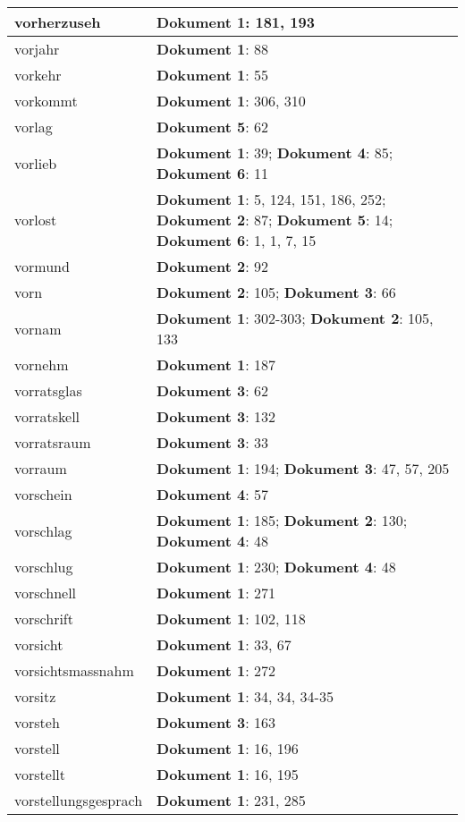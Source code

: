 \documentclass[a5paper]{article}
\begin{document}
\begin{longtable}[l]{|l|p{3in}|}
vorherzuseh & \textbf{Dokument 1}: 181, 193 \\
\hline
vorjahr & \textbf{Dokument 1}: 88 \\
\hline
vorkehr & \textbf{Dokument 1}: 55 \\
\hline
vorkommt & \textbf{Dokument 1}: 306, 310 \\
\hline
vorlag & \textbf{Dokument 5}: 62 \\
\hline
vorlieb & \textbf{Dokument 1}: 39; \textbf{Dokument 4}: 85; \textbf{Dokument 6}: 11 \\
\hline
vorlost & \textbf{Dokument 1}: 5, 124, 151, 186, 252; \textbf{Dokument 2}: 87; \textbf{Dokument 5}: 14; \textbf{Dokument 6}: 1, 1, 7, 15 \\
\hline
vormund & \textbf{Dokument 2}: 92 \\
\hline
vorn & \textbf{Dokument 2}: 105; \textbf{Dokument 3}: 66 \\
\hline
vornam & \textbf{Dokument 1}: 302-303; \textbf{Dokument 2}: 105, 133 \\
\hline
vornehm & \textbf{Dokument 1}: 187 \\
\hline
vorratsglas & \textbf{Dokument 3}: 62 \\
\hline
vorratskell & \textbf{Dokument 3}: 132 \\
\hline
vorratsraum & \textbf{Dokument 3}: 33 \\
\hline
vorraum & \textbf{Dokument 1}: 194; \textbf{Dokument 3}: 47, 57, 205 \\
\hline
vorschein & \textbf{Dokument 4}: 57 \\
\hline
vorschlag & \textbf{Dokument 1}: 185; \textbf{Dokument 2}: 130; \textbf{Dokument 4}: 48 \\
\hline
vorschlug & \textbf{Dokument 1}: 230; \textbf{Dokument 4}: 48 \\
\hline
vorschnell & \textbf{Dokument 1}: 271 \\
\hline
vorschrift & \textbf{Dokument 1}: 102, 118 \\
\hline
vorsicht & \textbf{Dokument 1}: 33, 67 \\
\hline
vorsichtsmassnahm & \textbf{Dokument 1}: 272 \\
\hline
vorsitz & \textbf{Dokument 1}: 34, 34, 34-35 \\
\hline
vorsteh & \textbf{Dokument 3}: 163 \\
\hline
vorstell & \textbf{Dokument 1}: 16, 196 \\
\hline
vorstellt & \textbf{Dokument 1}: 16, 195 \\
\hline
vorstellungsgesprach & \textbf{Dokument 1}: 231, 285 \\

\end{longtable}
\end{document}
